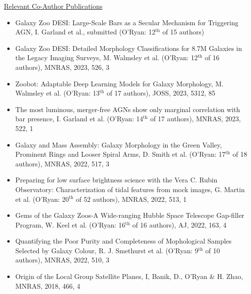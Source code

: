 \begin{pubs}
\underline{Relevant Co-Author Publications}
\begin{itemize}
	\item Galaxy Zoo DESI: Large-Scale Bars as a Secular Mechanism for Triggering AGN, I. Garland et al., submitted (O'Ryan: 12$^{\mathrm{th}}$ of 15 authors)
	\item Galaxy Zoo DESI: Detailed Morphology Classifications for 8.7M Galaxies in the Legacy Imaging Surveys, M. Walmsley et al. (O'Ryan: 12$^{\mathrm{th}}$ of 16 authors), MNRAS, 2023, 526, 3
	\item Zoobot: Adaptable Deep Learning Models for Galaxy Morphology, M. Walmsley et al. (O'Ryan: 13$^{\mathrm{th}}$ of 17 authors), JOSS, 2023, 5312, 85
	\item The most luminous, merger-free AGNs show only marginal correlation with bar presence, I. Garland et al. (O'Ryan: 14$^{\mathrm{th}}$ of 17 authors), MNRAS, 2023, 522, 1
	\item Galaxy and Mass Assembly: Galaxy Morphology in the Green Valley, Prominent Rings and Looser Spiral Arms, D. Smith et al. (O'Ryan: 17$^{\mathrm{th}}$ of 18 authors), MNRAS, 2022, 517, 3
	\item Preparing for low surface brightness science with the Vera C. Rubin Observatory: Characterization of tidal features from mock images, G. Martin et al. (O'Ryan: 20$^{\mathrm{th}}$ of 52 authors), MNRAS, 2022, 513, 1
	\item Gems of the Galaxy Zoos-A Wide-ranging Hubble Space Telescope Gap-filler Program, W. Keel et al. (O'Ryan: 16$^{\mathrm{th}}$ of 16 authors), AJ, 2022, 163, 4
	\item Quantifying the Poor Purity and Completeness of Mophological Samples Selected by Galaxy Colour, R. J. Smethurst et al. (O'Ryan: 9$^{\mathrm{th}}$ of 10 authors), MNRAS, 2022, 510, 3
	\item Origin of the Local Group Satellite Planes, I, Banik, D., O'Ryan \&  H. Zhao, MNRAS, 2018, 466, 4
\end{itemize}

\end{pubs}

